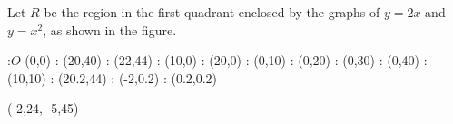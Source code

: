 
%
%
%
%
% 
% 
\question  Let $R$ be the region in the first quadrant enclosed by the graphs of $y=2x$ and $y=x^2$, as shown in the figure.

\begin{marginfigure}
:$O$ (0,0)
: (20,40)
: (22,44)
: (10,0)
: (20,0)
: (0,10)
: (0,20)
: (0,30)
: (0,40)
: (10,10)
: (20.2,44)
: (-2,0.2)
: (0.2,0.2)

\figdrawbegin{}
\figdrawcurve [12,13,10,2,3,11]
\figdrawline [1,3]
(-2,24, -5,45)
\figdrawend
\centerline{\box\figBoxA}
\end{marginfigure}

